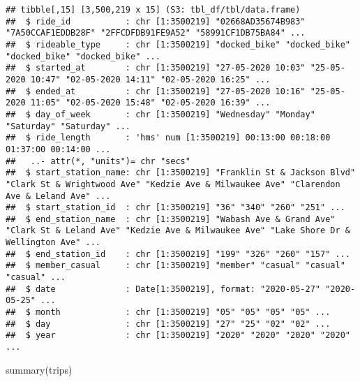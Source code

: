 \documentclass[
]{article}
\newenvironment{Shaded}{\begin{snugshade}}{\end{snugshade}}
\newcommand{\FunctionTok}[1]{\textcolor[rgb]{0.00,0.00,0.00}{#1}}
\newcommand{\NormalTok}[1]{#1}
\begin{document}
\begin{verbatim}
## tibble[,15] [3,500,219 x 15] (S3: tbl_df/tbl/data.frame)
##  $ ride_id           : chr [1:3500219] "02668AD35674B983" "7A50CCAF1EDDB28F" "2FFCDFDB91FE9A52" "58991CF1DB75BA84" ...
##  $ rideable_type     : chr [1:3500219] "docked_bike" "docked_bike" "docked_bike" "docked_bike" ...
##  $ started_at        : chr [1:3500219] "27-05-2020 10:03" "25-05-2020 10:47" "02-05-2020 14:11" "02-05-2020 16:25" ...
##  $ ended_at          : chr [1:3500219] "27-05-2020 10:16" "25-05-2020 11:05" "02-05-2020 15:48" "02-05-2020 16:39" ...
##  $ day_of_week       : chr [1:3500219] "Wednesday" "Monday" "Saturday" "Saturday" ...
##  $ ride_length       : 'hms' num [1:3500219] 00:13:00 00:18:00 01:37:00 00:14:00 ...
##   ..- attr(*, "units")= chr "secs"
##  $ start_station_name: chr [1:3500219] "Franklin St & Jackson Blvd" "Clark St & Wrightwood Ave" "Kedzie Ave & Milwaukee Ave" "Clarendon Ave & Leland Ave" ...
##  $ start_station_id  : chr [1:3500219] "36" "340" "260" "251" ...
##  $ end_station_name  : chr [1:3500219] "Wabash Ave & Grand Ave" "Clark St & Leland Ave" "Kedzie Ave & Milwaukee Ave" "Lake Shore Dr & Wellington Ave" ...
##  $ end_station_id    : chr [1:3500219] "199" "326" "260" "157" ...
##  $ member_casual     : chr [1:3500219] "member" "casual" "casual" "casual" ...
##  $ date              : Date[1:3500219], format: "2020-05-27" "2020-05-25" ...
##  $ month             : chr [1:3500219] "05" "05" "05" "05" ...
##  $ day               : chr [1:3500219] "27" "25" "02" "02" ...
##  $ year              : chr [1:3500219] "2020" "2020" "2020" "2020" ...
\end{verbatim}

\begin{Shaded}
\begin{Highlighting}[]
\FunctionTok{summary}\NormalTok{(trips)}
\end{Highlighting}
\end{Shaded}
\end{document}
